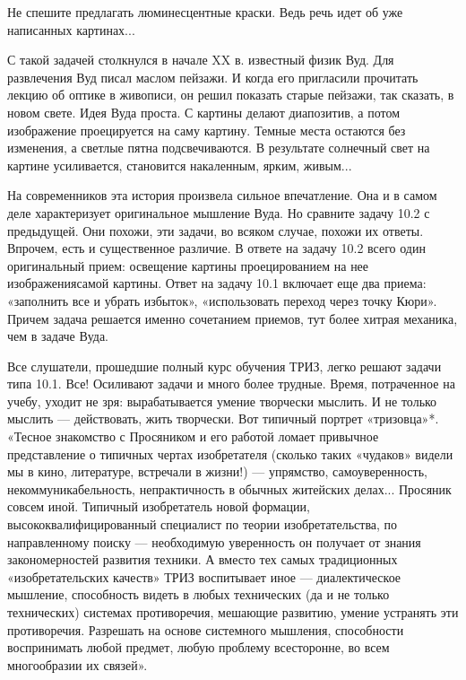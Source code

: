 Не спешите  предлагать люминесцентные  краски. Ведь  речь идет  об уже
написанных картинах...

С такой  задачей столкнулся в  начале XX  в. известный физик  Вуд. Для
развлечения Вуд писал маслом пейзажи. И когда его пригласили прочитать
лекцию об  оптике в  живописи, он решил  показать старые  пейзажи, так
сказать, в новом свете. Идея Вуда проста. С картины делают диапозитив,
а  потом  изображение  проецируется  на  саму  картину.  Темные  места
остаются без  изменения, а светлые пятна  подсвечиваются. В результате
солнечный свет  на картине усиливается, становится  накаленным, ярким,
живым...

На современников  эта история произвела  сильное впечатление. Она  и в
самом  деле  характеризует  оригинальное мышление  Вуда.  Но  сравните
задачу 10.2  с предыдущей. Они  похожи, эти задачи, во  всяком случае,
похожи  их ответы.  Впрочем, есть  и существенное  различие. В  ответе
на  задачу  10.2  всего  один оригинальный  прием:  освещение  картины
проецированием  на  нее  изображениясамой  картины.  Ответ  на  задачу
10.1  включает  еще два  приема:  «заполнить  все и  убрать  избыток»,
«использовать переход через точку Кюри». Причем задача решается именно
сочетанием приемов, тут более хитрая механика, чем в задаче Вуда.

Все  слушатели,  прошедшие полный  курс  обучения  ТРИЗ, легко  решают
задачи типа 10.1. Все! Осиливают  задачи и много более трудные. Время,
потраченное на  учебу, уходит не зря:  вырабатывается умение творчески
мыслить.  И  не только  мыслить  —  действовать, жить  творчески.  Вот
типичный портрет  «тризовца»*. «Тесное  знакомство с Просяником  и его
работой ломает привычное представление  о типичных чертах изобретателя
(сколько  таких  «чудаков» видели  мы  в  кино, литературе,  встречали
в   жизни!)   —  упрямство,   самоуверенность,   некоммуникабельность,
непрактичность   в   обычных   житейских  делах...   Просяник   совсем
иной.  Типичный изобретатель  новой формации,  высококвалифицированный
специалист  по  теории  изобретательства, по  направленному  поиску  —
необходимую уверенность он получает от знания закономерностей развития
техники. А  вместо тех  самых традиционных  «изобретательских качеств»
ТРИЗ воспитывает иное —  диалектическое мышление, способность видеть в
любых технических (да и  не только технических) системах противоречия,
мешающие  развитию, умение  устранять эти  противоречия. Разрешать  на
основе  системного мышления,  способности воспринимать  любой предмет,
любую проблему всесторонне, во всем многообразии их связей».


